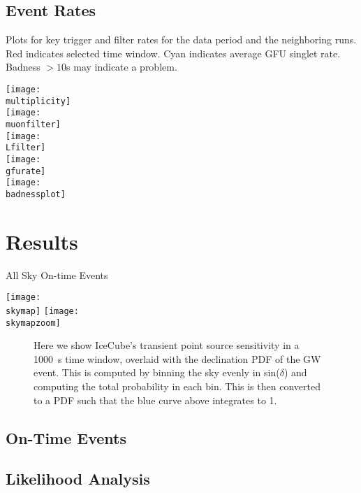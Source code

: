 \documentclass[titlepage]{article}
\begin{document}
\pagebreak
\subsection{Event Rates}
Plots for key trigger and filter rates for the data period
and the neighboring runs.  Red indicates selected time window.
Cyan indicates average GFU singlet rate. Badness $>10$s may indicate
a problem.

\vspace{1em}
{
 \centering
 \texttt{[image: \\multiplicity]}\\
 \texttt{[image: \\muonfilter]}\\
 \texttt{[image: \\Lfilter]}\\
 \texttt{[image: \\gfurate]}\\
 \texttt{[image: \\badnessplot]}
}
\vspace{2cm}

\pagebreak

\section{Results}

{
  \centering
  {\Large All Sky On-time Events}

  \texttt{[image: \\skymap]}
  \vspace{3cm}
  \texttt{[image: \\skymapzoom]}
}

\begin{figure}
    \centering
    \decPDF
    \caption{Here we show IceCube's transient point source sensitivity in a 1000~s time window, overlaid with the declination PDF of the GW event. This is computed by binning the sky evenly in sin($\delta$) and computing the total probability in each bin. This is then converted to a PDF such that the blue curve above integrates to 1.}
\end{figure}

\newpage
\subsection{On-Time Events}
\event

\subsection{Likelihood Analysis}
\results

\newpage
\end{document}
